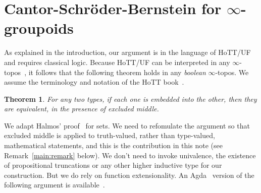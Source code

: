 \documentclass{article}
\newtheorem{theorem}{Theorem}[section]
\theoremstyle{definition}
\begin{document}
\section{Cantor-Schr\"oder-Bernstein for $\infty$-groupoids}

As explained in the introduction, our argument is in the language of
HoTT/UF and requires classical logic. Because HoTT/UF can be
interpreted in any $\infty$-topos~\cite{shulman:infty}, it follows
that the following theorem holds in any \emph{boolean} $\infty$-topos.
We assume the terminology and notation of the HoTT
book~\cite{hottbook}.

\begin{theorem}
For any two types, if each one is embedded into the
other, then they are equivalent, in the presence of excluded middle.
\end{theorem}

We adapt Halmos' proof~\cite{MR0453532} for sets. We need to
refomulate the argument so that excluded middle is applied to
truth-valued, rather than type-valued, mathematical statements, and
this is the contribution in this note (see Remark~\ref{main:remark}
below).  We don't need to invoke univalence, the existence of
propositional truncations or any other higher inductive type for our
construction. But we do rely on function extensionality. An
Agda~\cite{agda} version of the following argument is
available~\cite{2019arXiv191100580H,escardo:csb}.
\end{document}
